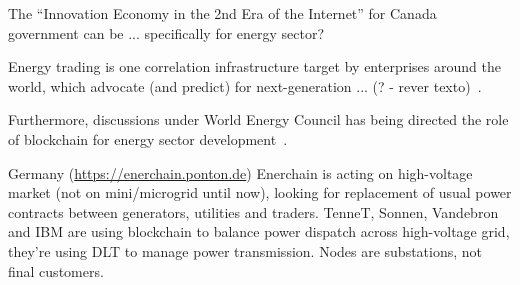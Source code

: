 The ``Innovation Economy in the 2nd Era of the Internet'' for Canada government can be ... specifically for energy sector?~\cite{don2017}

Energy trading is one correlation infrastructure target by enterprises around the world, which advocate (and predict) for next-generation ... (? - rever texto)~\cite{sven2013}.

Furthermore, discussions under World Energy Council has being directed the role of blockchain for energy sector development~\cite{wec2017}.



Germany (\url{https://enerchain.ponton.de})
Enerchain is acting on high-voltage market (not on mini/microgrid until now), looking for replacement of usual power contracts between generators, utilities and traders.
TenneT, Sonnen, Vandebron and IBM are using blockchain to balance power dispatch across high-voltage grid, they're using DLT to manage power transmission. Nodes are substations, not final customers.


